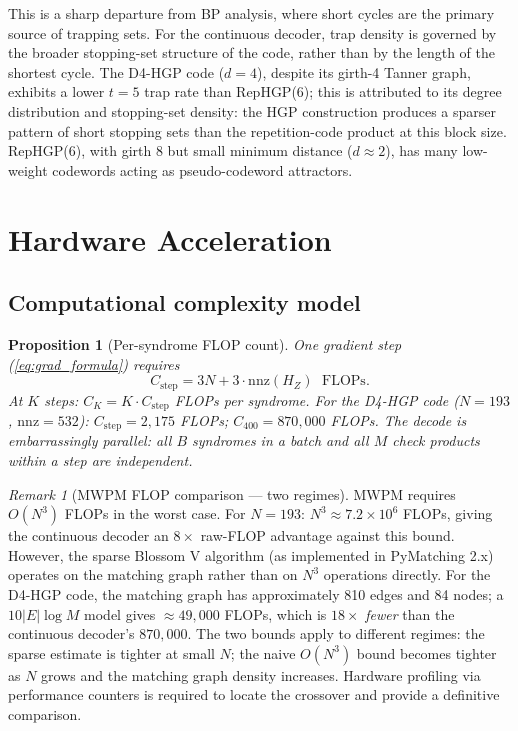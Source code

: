 \documentclass[12pt,a4paper]{article}
\theoremstyle{plain}
\newtheorem{proposition}[theorem]{Proposition}
\theoremstyle{definition}
\theoremstyle{remark}
\newtheorem{remark}[theorem]{Remark}
\newcommand{\HZ}{H_Z}
\begin{document}
This is a sharp departure from BP analysis, where short cycles are the
primary source of trapping sets.
For the continuous decoder, trap density is governed by the broader
stopping-set structure of the code,
rather than by the length of the shortest cycle.
The D4-HGP code ($d=4$), despite its girth-4 Tanner graph, exhibits a lower
$t=5$ trap rate than RepHGP(6); this is attributed to its degree
distribution and stopping-set density: the HGP construction produces
a sparser pattern of short stopping sets than the repetition-code product
at this block size.
RepHGP(6), with girth 8 but small minimum distance ($d\approx 2$), has
many low-weight codewords acting as pseudo-codeword attractors.

\section{Hardware Acceleration}\label{sec:hardware}

\subsection{Computational complexity model}

\begin{proposition}[Per-syndrome FLOP count]\label{prop:flops}
One gradient step (\cref{eq:grad_formula}) requires
\[
  C_{\mathrm{step}} = 3N + 3\cdot\mathrm{nnz}(\HZ) \;\text{ FLOPs}.
\]
At $K$ steps: $C_K = K\cdot C_{\mathrm{step}}$ FLOPs per syndrome.
For the D4-HGP code ($N=193$, $\mathrm{nnz}=532$):
$C_{\mathrm{step}} = 2{,}175$ FLOPs; $C_{400} = 870{,}000$ FLOPs.
The decode is \emph{embarrassingly parallel}: all $B$ syndromes in a
batch and all $M$ check products within a step are independent.
\end{proposition}

\begin{remark}[MWPM FLOP comparison — two regimes]\label{rem:flop}
MWPM requires $O(N^3)$ FLOPs in the worst case.
For $N=193$: $N^3 \approx 7.2\times 10^6$ FLOPs, giving the continuous
decoder an $8\times$ raw-FLOP advantage against this bound.
However, the sparse Blossom V algorithm (as implemented in PyMatching 2.x)
operates on the matching graph rather than on $N^3$ operations directly.
For the D4-HGP code, the matching graph has approximately 810 edges and
84 nodes; a $10\lvert E\rvert\log M$ model gives $\approx 49{,}000$ FLOPs,
which is $18\times$ \emph{fewer} than the continuous decoder's $870{,}000$.
The two bounds apply to different regimes: the sparse estimate is tighter
at small $N$; the naive $O(N^3)$ bound becomes tighter as $N$ grows and
the matching graph density increases.
Hardware profiling via performance counters is required to locate the
crossover and provide a definitive comparison.
\end{remark}
\end{document}
